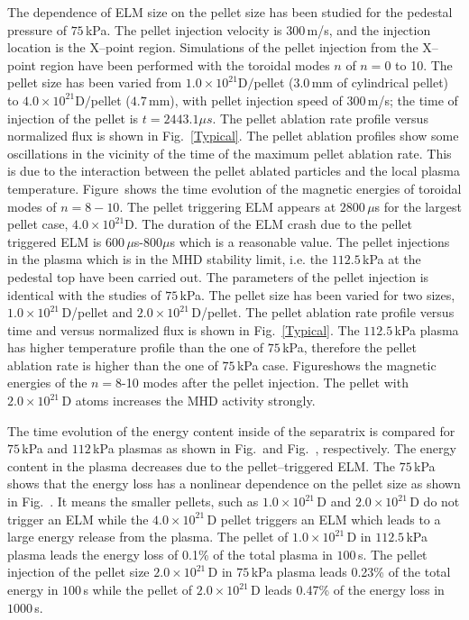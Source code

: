 \documentclass[a4paper,openany,12pt]{book}
\begin{document}
{The dependence of ELM size on the pellet size has been studied for the pedestal pressure of $75\,$kPa. The pellet injection velocity is $300\,$m/s, and the injection location is the X--point region. Simulations of the pellet injection from the X--point region have been performed with the toroidal modes $n$ of $n=0$ to 10. The pellet size has been varied from $1.0\times 10^{21}\mathrm{D}/$pellet ($3.0\,$mm of cylindrical pellet) to $4.0\times 10^{21}\mathrm{D}/$pellet ($4.7\,$mm), with pellet injection speed of $300\,$m/s; the time of injection of the pellet is $t=2443.1\mu s$. The pellet ablation rate profile versus normalized flux is shown in Fig.~\ref{Typical}. The pellet ablation profiles show some oscillations in the vicinity of the time of the maximum pellet ablation rate. This is due to the interaction between the pellet ablated particles and the local plasma temperature. Figure~\quad shows the time evolution of the magnetic energies of toroidal modes of $n=8-10$. The pellet triggering ELM appears at $2800\,\mu$s for the largest pellet case, 
$4.0\times 10^{21}\mathrm{D}$. The duration of the ELM crash due to the pellet triggered ELM is $600\,\mu$s-800$\mu$s which is a reasonable value. The pellet injections in the plasma which is in the MHD stability limit, i.e. the $112.5\,$kPa at the pedestal top have been carried out. The parameters of the pellet injection is identical with the studies of $75\,$kPa. The pellet size has been varied for two sizes, 
$1.0\times 10^{21}\,$D/pellet and $2.0\times 10^{21}\,$D/pellet. The pellet ablation rate profile versus time and versus normalized flux is shown in Fig.~\ref{Typical}. The $112.5\,$kPa plasma has higher temperature profile than the one of $75\,$kPa, therefore the pellet ablation rate is higher than the one of $75\,$kPa case. Figure\quad shows the magnetic energies of the $n=8$-10 modes after the pellet injection. The pellet with $2.0\times 10^{21}\,$D atoms increases the MHD activity strongly.

The time evolution of the energy content inside of the separatrix is compared for 
$75\,$kPa and $112\,$kPa plasmas as shown in Fig.~\quad and Fig.~\quad, respectively. The energy content in the plasma decreases due to the pellet--triggered ELM. The $75\,$kPa shows that the energy loss has a nonlinear dependence on the pellet size as shown in Fig.~\quad. It means the smaller pellets, such as $1.0\times 10^{21}\,$D and $2.0\times 10^{21}\,$D do not trigger an ELM while the $4.0\times 10^{21}\,$D pellet triggers an ELM which leads to a large energy release from the plasma. The pellet of $1.0\times 10^{21}\,$D in $112.5\,$kPa plasma leads the energy loss of 0.1\% of the total plasma in $100\,$s. The pellet injection of the pellet size $2.0\times 10^{21}\,$D in $75\,$kPa plasma leads 0.23\% of the total energy in $100\,$s while the pellet of $2.0\times 10^{21}\,$D leads 0.47\% of the energy loss in $1000\,$s.

}
\end{document}
